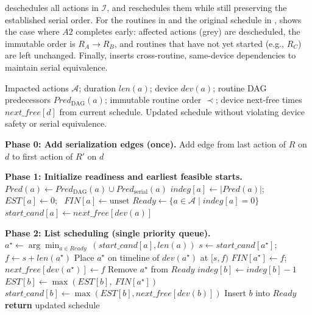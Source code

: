 \sysname{} deschedules all actions in $\mathcal{I}$, and reschedules them while still preserving the established serial order.
For the routines in  and the original \scheduler{} schedule in ,  shows the case where $A2$ completes early: affected actions (grey) are descheduled, the immutable order is $R_A\!\rightarrow\!R_B$, and routines that have not yet started (e.g., $R_C$) are left unchanged. Finally, \sysname{} inserts cross-routine, same-device dependencies to maintain serial equivalence. 

\begin{algorithm}[t]
    \caption{\bf Shortest Task First (STF) with Serializability}
    \label{rasc:algo:sjfw}
    \footnotesize
    \begin{algorithmic}[1]
    \Require Impacted actions $\mathcal{A}$; duration $len(a)$; device $dev(a)$;
             routine DAG predecessors $Pred_{\text{DAG}}(a)$; immutable routine order $\prec$;
             device next-free times $next\_free[d]$ from current schedule.
    \Ensure Updated schedule without violating device safety or serial equivalence.
    
    \Statex \textbf{Phase 0: Add serialization edges (once).}
        \State Add edge from last action of $R$ on $d$ to first action of $R'$ on $d$
      \EndFor
    \EndFor
    
    \Statex \textbf{Phase 1: Initialize readiness and earliest feasible starts.}
      \State $Pred(a) \gets Pred_{\text{DAG}}(a) \cup Pred_{\text{serial}}(a)$
      \State $indeg[a] \gets |Pred(a)|$; \ $EST[a] \gets 0$; \ $FIN[a] \gets \text{unset}$
    \EndFor
    \State $Ready \gets \{ a \in \mathcal{A} \mid indeg[a]=0 \}$
      \State $start\_cand[a] \gets next\_free[dev(a)]$
    \EndFor
    
    \Statex \textbf{Phase 2: List scheduling (single priority queue).}
     \label{rasc:algo:sjfw:while}
      \State $a^\star \gets \arg\min_{a \in Ready} \ (start\_cand[a], len(a))$  \label{rasc:algo:sjfw:pop}
      \State $s \gets start\_cand[a^\star]$; \ $f \gets s + len(a^\star)$
      \State Place $a^\star$ on timeline of $dev(a^\star)$ at $[s,f)$ \label{rasc:algo:sjfw:place}
      \State $FIN[a^\star] \gets f$; \ $next\_free[dev(a^\star)] \gets f$
      \State Remove $a^\star$ from $Ready$
       \label{rasc:algo:sjfw:succ}
        \State $indeg[b] \gets indeg[b]-1$
        \State $EST[b] \gets \max(EST[b], \ FIN[a^\star])$
          \State $start\_cand[b] \gets \max(EST[b], next\_free[dev(b)])$
          \State Insert $b$ into $Ready$
        \EndIf
      \EndFor
    \EndWhile
    \State \textbf{return} updated schedule
\end{algorithmic}
\end{algorithm}

